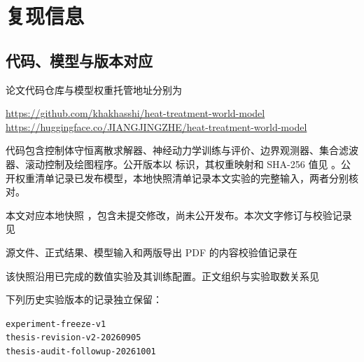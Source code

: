\documentclass[UTF8,zihao=-4,openany,fontset=mac]{ctexrep}
\begin{document}
\begingroup
{}
\tableofcontents
\endgroup
\clearpage
{}








\begingroup
\small
{}
\printbibliography[heading=bibintoc,title={参考文献}]
\endgroup

\appendix

\chapter{复现信息}
\section{代码、模型与版本对应}

论文代码仓库与模型权重托管地址分别为
\begin{center}
  \url{https://github.com/khakhasshi/heat-treatment-world-model}\\
  \url{https://huggingface.co/JIANGJINGZHE/heat-treatment-world-model}
\end{center}
代码包含控制体守恒离散求解器、神经动力学训练与评价、边界观测器、集合滤波器、滚动控制及绘图程序。公开版本以  标识，其权重映射和 SHA-256 值见 。公开权重清单记录已发布模型，本地快照清单记录本文实验的完整输入，两者分别核对。

本文对应本地快照 ，包含未提交修改，尚未公开发布。本次文字修订与校验记录见
\begin{center}
\end{center}
源文件、正式结果、模型输入和两版导出 PDF 的内容校验值记录在
\begin{center}
\end{center}
该快照沿用已完成的数值实验及其训练配置。正文组织与实验取数关系见
\begin{center}
\end{center}
下列历史实验版本的记录独立保留：
\begin{center}
  \small\texttt{experiment-freeze-v1}\\
  \texttt{thesis-revision-v2-20260905}\\
  \texttt{thesis-audit-followup-20261001}
\end{center}
\end{document}
